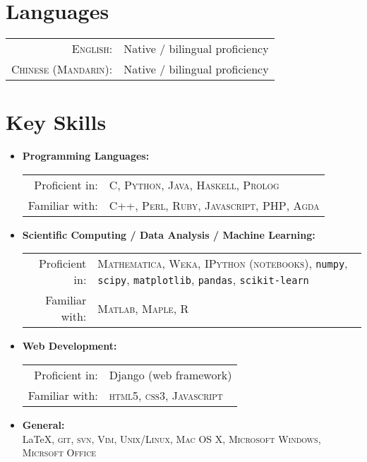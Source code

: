 \documentclass[a4paper,10pt]{article} %
\begin{document}

\section{Languages}

\begin{tabular}{rl}
\textsc{English:} & Native / bilingual proficiency\\
\textsc{Chinese (Mandarin):} & Native / bilingual proficiency\\
\end{tabular}


\section{Key Skills}

\begin{itemize}
\item \textbf{Programming Languages:}\\
\begin{tabular}{rl}
Proficient in: & \textsc{C}, \textsc{Python}, \textsc{Java}, \textsc{Haskell}, \textsc{Prolog}\\
Familiar with: & \textsc{C++}, \textsc{Perl}, \textsc{Ruby}, \textsc{Javascript}, \textsc{PHP}, \textsc{Agda}
\end{tabular}
\item \textbf{Scientific Computing / Data Analysis / Machine Learning:}\\
\begin{tabular}{rp{10cm}}
Proficient in: & \textsc{Mathematica}, \textsc{Weka}, \textsc{IPython (notebooks)}, \texttt{numpy}, \texttt{scipy}, \texttt{matplotlib}, \texttt{pandas}, \texttt{scikit-learn} \\
Familiar with: & \textsc{Matlab}, \textsc{Maple}, \textsc{R}
\end{tabular}
\item \textbf{Web Development:}\\
\begin{tabular}{rl}
Proficient in: & Django (web framework)\\
Familiar with: & \textsc{html5}, \textsc{css3}, \textsc{Javascript}
\end{tabular}
\item \textbf{General:}\\
\fb \LaTeX, \textsc{git}, \textsc{svn}, \textsc{Vim}, \textsc{Unix/Linux}, \textsc{Mac OS X}, \textsc{Microsoft Windows}, \textsc{Micrsoft Office}
\end{itemize}
\end{document}
